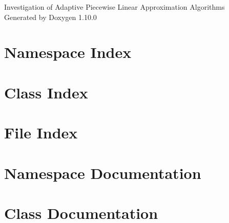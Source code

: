 \documentclass[twoside]{book}
\newcommand{\+}{\discretionary{\mbox{\scriptsize$\hookleftarrow$}}{}{}}
\newcommand{\clearemptydoublepage}{%
    \newpage{\pagestyle{empty}\cleardoublepage}%
  }
\begin{document}
  \raggedbottom
    \hypersetup{pageanchor=false,
                bookmarksnumbered=true,
                pdfencoding=unicode
               }
  \begin{titlepage}
  \vspace*{7cm}
  \begin{center}%
  {\Large Investigation of Adaptive Piecewise Linear Approximation Algorithms}\\
  \vspace*{1cm}
  {\large Generated by Doxygen 1.10.0}\\
  \end{center}
  \end{titlepage}
  \clearemptydoublepage
  \tableofcontents
  \clearemptydoublepage
  \hypersetup{pageanchor=true}

\chapter{Namespace Index}

\chapter{Class Index}

\chapter{File Index}

\chapter{Namespace Documentation}
























\chapter{Class Documentation}















\end{document}
